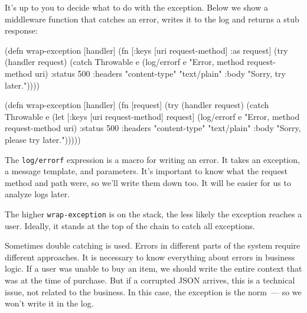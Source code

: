It's up to you to decide what to do with the exception. Below we show a middleware function that catches an error, writes it to the log and returns a stub response:


\ifx\DEVICETYPE\MOBILE

\begin{english}
  \begin{clojure}
(defn wrap-exception [handler]
  (fn [{:keys [uri request-method]
        :as request}]
    (try
      (handler request)
      (catch Throwable e
        (log/errorf e
          "Error, method %
          request-method uri)
          {:status 500
           :headers
           {"content-type" "text/plain"}
           :body "Sorry, try later."}))))
  \end{clojure}
\end{english}

\else

\begin{english}
  \begin{clojure}
(defn wrap-exception [handler]
  (fn [request]
    (try
      (handler request)
      (catch Throwable e
        (let [{:keys [uri request-method]} request]
          (log/errorf e "Error, method %
                      request-method uri)
          {:status 500
           :headers {"content-type" "text/plain"}
           :body "Sorry, please try later."})))))
  \end{clojure}
\end{english}

\fi


The \verb|log/errorf| expression is a macro for writing an error. It takes an exception, a message template, and parameters. It's important to know what the request method and path were, so we'll write them down too. It will be easier for us to analyze logs later.

The higher \verb|wrap-exception| is on the stack, the less likely the exception reaches a user. Ideally, it stands at the top of the chain to catch all exceptions.

Sometimes double catching is used. Errors in different parts of the system require different approaches. It is necessary to know everything about errors in business logic. If a user was unable to buy an item, we should write the entire context that was at the time of purchase. But if a corrupted JSON arrives, this is a technical issue, not related to the business. In this case, the exception is the norm~--- so we won't write it in the log.

